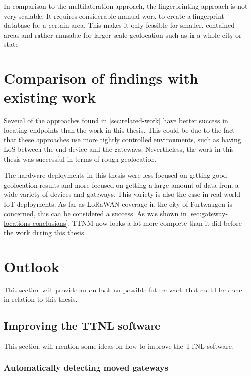 

In comparison to the multilateration approach, the fingerprinting approach is not very scalable.
It requires considerable manual work to create a fingerprint database for a certain area.
This makes it only feasible for smaller, contained areas and rather unusable for larger-scale geolocation such as in a whole city or state.

\section{Comparison of findings with existing work}

Several of the approaches found in \cref{sec:related-work} have better success in locating endpoints than the work in this thesis.
This could be due to the fact that these approaches use more tightly controlled environments, such as having \ac{LoS} between the end device and the gateways.
Nevertheless, the work in this thesis was successful in terms of rough geolocation.

The hardware deployments in this thesis were less focused on getting good geolocation results and more focused on getting a large amount of data from a wide variety of devices and gateways.
This variety is also the case in real-world \ac{IoT} deployments.
As far as \ac{LoRaWAN} coverage in the city of Furtwangen is concerned, this can be considered a success.
As was shown in \cref{sec:gateway-locations-conclusions}, \ac{TTNM} now looks a lot more complete than it did before the work during this thesis.

\section{Outlook}

This section will provide an outlook on possible future work that could be done in relation to this thesis.

\subsection{Improving the \acf{TTNL} software}

This section will mention some ideas on how to improve the \ac{TTNL} software.

\subsubsection{Automatically detecting moved gateways}

